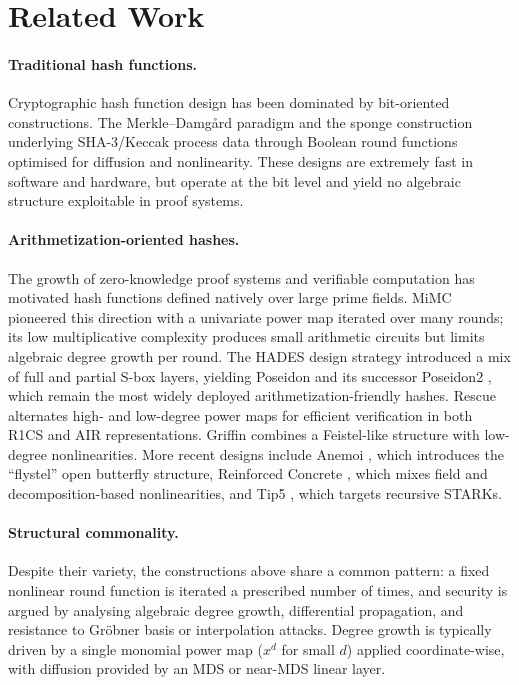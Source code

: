 ﻿\documentclass[english]{aucmcs}
\begin{document}
\section{Related Work}
\label{sec:related}

\paragraph{Traditional hash functions.}
Cryptographic hash function design has been dominated by bit-oriented
constructions.  The Merkle--Damg{\aa}rd paradigm \cite{SHA2} and the
sponge construction underlying SHA-3/Keccak \cite{KeccakFIPS202}
process data through Boolean round functions optimised for diffusion and
nonlinearity.  These designs are extremely fast in software and
hardware, but operate at the bit level and yield no algebraic structure
exploitable in proof systems.

\paragraph{Arithmetization-oriented hashes.}
The growth of zero-knowledge proof systems and verifiable computation
has motivated hash functions defined natively over large prime fields.
MiMC \cite{MiMC} pioneered this direction with a univariate power map
iterated over many rounds; its low multiplicative complexity produces
small arithmetic circuits but limits algebraic degree growth per round.
The HADES design strategy \cite{HADES} introduced a mix of full and partial
S-box layers, yielding Poseidon \cite{Poseidon} and its successor
Poseidon2 \cite{Poseidon2}, which remain the most widely deployed
arithmetization-friendly hashes.  Rescue \cite{Rescue} alternates
high- and low-degree power maps for efficient verification in both
R1CS and AIR representations.  Griffin \cite{Griffin} combines a
Feistel-like structure with low-degree nonlinearities.  More recent
designs include Anemoi \cite{Anemoi}, which introduces the ``flystel''
open butterfly structure, Reinforced Concrete \cite{ReinforcedConcrete},
which mixes field and decomposition-based nonlinearities, and
Tip5 \cite{Tip5}, which targets recursive STARKs.

\paragraph{Structural commonality.}
Despite their variety, the constructions above share a common pattern:
a fixed nonlinear round function is iterated a prescribed number of
times, and security is argued by analysing algebraic degree growth,
differential propagation, and resistance to Gr\"obner basis or
interpolation attacks.  Degree growth is typically driven by a single
monomial power map ($x^d$ for small $d$) applied coordinate-wise,
with diffusion provided by an MDS or near-MDS linear layer.
\end{document}
